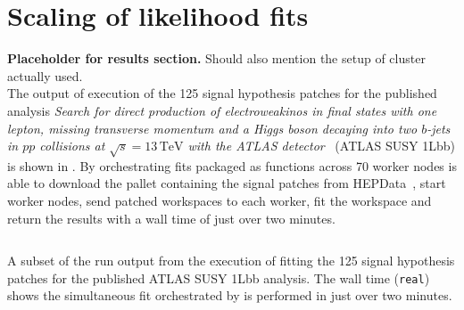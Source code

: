 \section{Scaling of likelihood fits}\label{sec:results}

\textbf{Placeholder for results section.}
Should also mention the setup of cluster actually used.\\

The output of execution of the 125 signal hypothesis patches for the published analysis \textit{Search for direct production of electroweakinos in final states with one lepton, missing transverse momentum and a Higgs boson decaying into two \(b\)-jets in \(pp\) collisions at \(\sqrt{s} = 13\,\text{TeV}\) with the ATLAS detector}~\cite{SUSY-2019-08} (ATLAS SUSY 1Lbb) is shown in .
By orchestrating \pyhf{} fits packaged as \funcX{} functions across 70 worker nodes \funcX{} is able to download the \pyhf{} pallet containing the signal patches from HEPData~\cite{ATLAS_SUSY_1Lbb_pallet}, start \funcX{} worker nodes, send patched workspaces to each worker, fit the workspace and return the results with a wall time of just over two minutes.
\\

\begin{listing}
 \inputminted{text}{src/code/funcX_demo_output.txt}
 \caption{A subset of the run output from the execution of fitting the 125 signal hypothesis patches for the published ATLAS SUSY 1Lbb analysis.
 The wall time (\texttt{real}) shows the simultaneous fit orchestrated by \funcX{} is performed in just over two minutes.}
 \label{lst:funcX_demo_output}
\end{listing}
